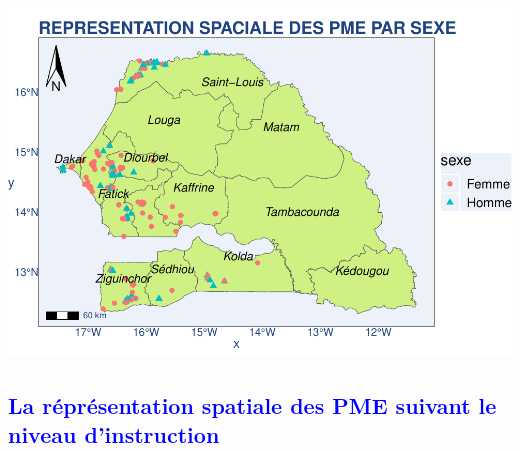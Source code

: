 \documentclass[
]{article}
\begin{document}
\includegraphics{PROJET_files/figure-latex/unnamed-chunk-23-1.pdf}

\newpage

\textcolor{blue}{\subsection{ La réprésentation spatiale des PME suivant le niveau d’instruction}}
\end{document}
